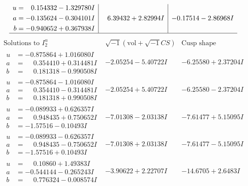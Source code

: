 \documentclass[1p]{elsarticle_modified}
\theoremstyle{definition}
\newcommand{\I}{\sqrt{-1}}
\begin{document}
$$\begin{array}{c|c|c}
\begin{aligned}
u &= \phantom{-}0.154332 - 1.329780 I \\
a &= -0.135624 - 0.304101 I \\
b &= -0.940652 + 0.367938 I\end{aligned}
 & \phantom{-}6.39432 + 2.82994 I & -0.17514 - 2.86968 I\\
 \hline 
 \end{array}$$\newpage$$\begin{array}{c|c|c}  
\text{Solutions to }I^u_{2}& \I (\text{vol} + \sqrt{-1}CS) & \text{Cusp shape}\\
 \hline 
\begin{aligned}
u &= -0.875864 + 1.016080 I \\
a &= \phantom{-}0.354410 + 0.314481 I \\
b &= \phantom{-}0.181318 - 0.990508 I\end{aligned}
 & -2.05254 - 5.40722 I & -6.25580 + 2.37204 I \\ \hline\begin{aligned}
u &= -0.875864 - 1.016080 I \\
a &= \phantom{-}0.354410 - 0.314481 I \\
b &= \phantom{-}0.181318 + 0.990508 I\end{aligned}
 & -2.05254 + 5.40722 I & -6.25580 - 2.37204 I \\ \hline\begin{aligned}
u &= -0.089933 + 0.626357 I \\
a &= \phantom{-}0.948435 + 0.750652 I \\
b &= -1.57516 - 0.10493 I\end{aligned}
 & -7.01308 - 2.03138 I & -7.61477 + 5.15095 I \\ \hline\begin{aligned}
u &= -0.089933 - 0.626357 I \\
a &= \phantom{-}0.948435 - 0.750652 I \\
b &= -1.57516 + 0.10493 I\end{aligned}
 & -7.01308 + 2.03138 I & -7.61477 - 5.15095 I \\ \hline\begin{aligned}
u &= \phantom{-}0.10860 + 1.49383 I \\
a &= -0.544144 - 0.265243 I \\
b &= \phantom{-}0.776324 - 0.008574 I\end{aligned}
 & -3.90622 + 2.22707 I & -14.6705 + 2.6483 I \\ \hline\begin{aligned}

\end{aligned}
\end{array}$$
\end{document}
